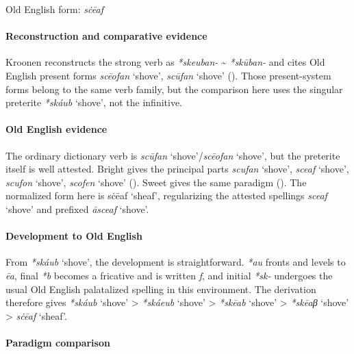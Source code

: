 \documentclass[
  british,
  a4paper,
]{article}
\providecommand{\Recon}[1]{\emph{*#1}}
\begin{document}
Old English form: \emph{sċēaf}

\paragraph{Reconstruction and comparative
evidence}\label{reconstruction-and-comparative-evidence-131}

Kroonen reconstructs the strong verb as \emph{*skeuban-}
\textasciitilde{} \emph{*skūban-} and cites Old English present forms
{\emph{scēofan}} `shove', {\emph{scūfan}} `shove'
(). Those present-system
forms belong to the same verb family, but the comparison here uses the
singular preterite \Recon{skáub} `shove', not the infinitive.

\paragraph{Old English evidence}\label{old-english-evidence-131}

The ordinary dictionary verb is {\emph{scūfan}} `shove'/{\emph{scēofan}}
`shove', but the preterite itself is well attested. Bright gives the
principal parts {\emph{scufan}} `shove', {\emph{sceaf}} `shove',
{\emph{scufon}} `shove', {\emph{scofen}} `shove'
(). Sweet gives
the same paradigm (). The
normalized form here is {sċēaf} `sheaf', regularizing the attested
spellings {\emph{sceaf}} `shove' and prefixed {\emph{āsceaf}} `shove'.

\paragraph{Development to Old
English}\label{development-to-old-english-131}

From \Recon{skáub} `shove', the development is straightforward.
\emph{*au} fronts and levels to \emph{ēa}, final \emph{*b} becomes a
fricative and is written \emph{f}, and initial \emph{*sk-} undergoes the
usual Old English palatalized spelling in this environment. The
derivation therefore gives \Recon{skáub} `shove' \textgreater{}
\Recon{skáeub} `shove' \textgreater{} \Recon{skēab} `shove'
\textgreater{} \Recon{skēaβ} `shove' \textgreater{} {\emph{sċēaf}}
`sheaf'.

\paragraph{Paradigm comparison}\label{paradigm-comparison-14}
\end{document}
